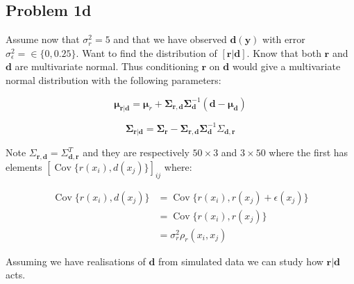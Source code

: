 \documentclass[]{article}
\newcommand{\vect}[1]{\ensuremath{\boldsymbol{\mathbf{#1}}}}
\newcommand{\matr}[1]{\ensuremath{\boldsymbol{\mathbf{#1}}}}
\DeclareMathOperator{\Cov}{\text{Cov}}
\begin{document}
\hypertarget{problem-1d}{%
\subsection{Problem 1d}\label{problem-1d}}

Assume now that \(\sigma_r^2 = 5\) and that we have observed
\(\vect d(\vect y)\) with error
\(\sigma_\epsilon^2 = \in \lbrace 0, 0.25 \rbrace\). Want to find the
distribution of \(\left[ \vect r | \vect d \right]\). Know that both
\(\vect r\) and \(\vect d\) are multivariate normal. Thus conditioning
\(\vect r\) on \(\vect d\) would give a multivariate normal distribution
with the following parameters:

\begin{equation}
     \vect\mu_{\vect r | \vect d} = \vect \mu_r+ \matr \Sigma_{\vect r, \vect d} \matr \Sigma_{\vect d}^{-1}(\vect d - \vect \mu_{\vect d})
\end{equation}

\begin{equation}
      \vect\Sigma_{\vect r | \vect d} = \matr \Sigma_{\vect r} - \matr \Sigma_{\vect r, \vect d} \matr \Sigma_{\vect d}^{-1}\Sigma_{\vect d, \vect r}
\end{equation}

Note \(\Sigma_{\vect r, \vect d} = \Sigma_{\vect d, \vect r}^T\) and
they are respectively \(50\times 3\) and \(3\times 50\) where the first
has elements \([\Cov\lbrace r(x_i), d(x_j)\rbrace]_{ij}\) where:

\begin{equation}
    \begin{split}
        \Cov\lbrace r(x_i), d(x_j)\rbrace &= \Cov\lbrace r(x_i), r(x_j) + \epsilon(x_j)\rbrace  \\
        &= \Cov\lbrace r(x_i), r(x_j)\rbrace \\ 
        &= \sigma_r^2\rho_r(x_i, x_j)
    \end{split}
\end{equation}

Assuming we have realisations of \(\vect d\) from simulated data we can
study how \(\vect r | \vect d\) acts.
\end{document}
